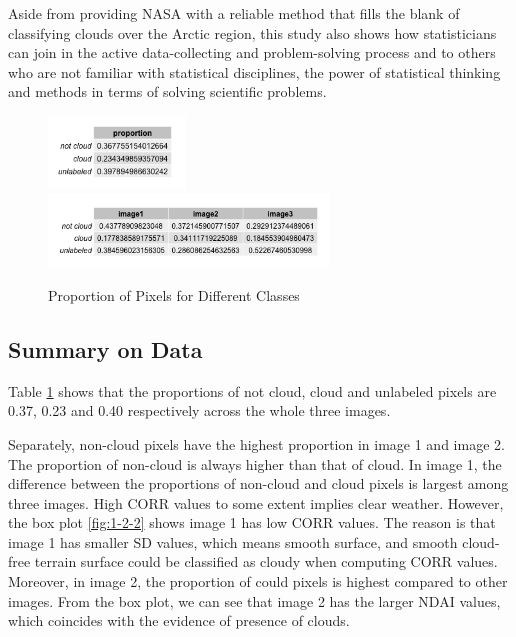 \documentclass[11pt]{article}
\begin{document}
Aside from providing NASA with a reliable method that fills the blank of classifying clouds over the Arctic region, this study also shows how statisticians can join in the active data-collecting and problem-solving process and to others who are not familiar with statistical disciplines, the power of statistical thinking and methods in terms of solving scientific problems.


\begin{figure}
\includegraphics[width=0.325\textwidth]{1-2-1.png}
\includegraphics[width=0.665\textwidth]{1-2-2.png}
\caption{Proportion of Pixels for Different Classes}
\label{fig:1-2-1}
\centering
\end{figure}

\subsection{Summary on Data}
Table \ref{fig:1-2-1} shows that the proportions of not cloud, cloud and unlabeled pixels are 0.37, 0.23 and 0.40 respectively across the whole three images.

Separately, non-cloud pixels have the highest proportion in image 1 and image 2. The proportion of non-cloud is always higher than that of cloud. In image 1, the difference between the proportions of non-cloud and cloud pixels is largest among three images. High CORR values to some extent implies clear weather. However, the box plot \ref{fig:1-2-2} shows image 1 has low CORR values. The reason is that image 1 has smaller SD values, which means smooth surface, and smooth cloud-free terrain surface could be classified as cloudy when computing CORR values. Moreover, in image 2, the proportion of could pixels is highest compared to other images. From the box plot, we can see that image 2 has the larger NDAI values, which coincides with the evidence of presence of clouds. 
\end{document}
